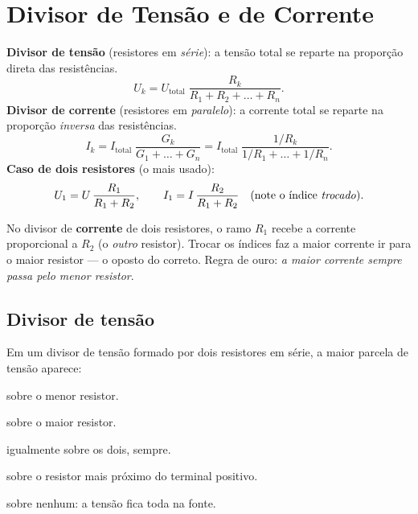 \section{Divisor de Tensão e de Corrente}

\begin{conceito}
\textbf{Divisor de tensão} (resistores em \emph{série}): a tensão total se
reparte na proporção direta das resistências.
\[
U_k = U_{\text{total}}\;\frac{R_k}{R_1+R_2+\dots+R_n}.
\]
\textbf{Divisor de corrente} (resistores em \emph{paralelo}): a corrente total se
reparte na proporção \emph{inversa} das resistências.
\[
I_k = I_{\text{total}}\;\frac{G_k}{G_1+\dots+G_n}
     = I_{\text{total}}\;\frac{1/R_k}{1/R_1+\dots+1/R_n}.
\]
\textbf{Caso de dois resistores} (o mais usado):
\[
U_1 = U\,\frac{R_1}{R_1+R_2}, \qquad
I_1 = I\,\frac{R_2}{R_1+R_2}\quad(\text{note o índice \emph{trocado}}).
\]
\end{conceito}

\begin{atencao}
No divisor de \textbf{corrente} de dois resistores, o ramo $R_1$ recebe a
corrente proporcional a $R_2$ (o \emph{outro} resistor). Trocar os índices faz a
maior corrente ir para o maior resistor --- o oposto do correto. Regra de ouro:
\emph{a maior corrente sempre passa pelo menor resistor}.
\end{atencao}

\legendaniveis

\subsection{Divisor de tensão}

\blocofixacao

\begin{questao}[1]{}
Em um divisor de tensão formado por dois resistores em série, a maior parcela de
tensão aparece:
\begin{alternativas}
\item sobre o menor resistor.
\item sobre o maior resistor.
\item igualmente sobre os dois, sempre.
\item sobre o resistor mais próximo do terminal positivo.
\item sobre nenhum: a tensão fica toda na fonte.
\end{alternativas}
\end{questao}

